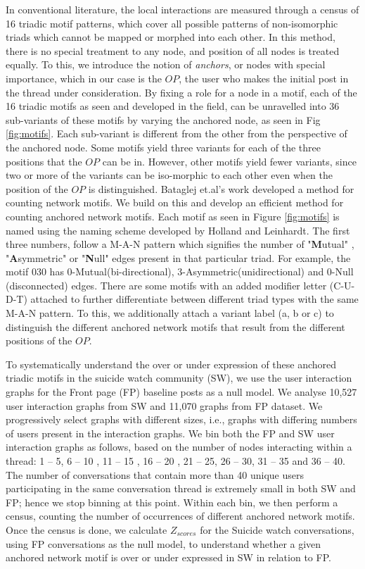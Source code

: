 In conventional literature, the local interactions are measured through a census of 16 triadic motif patterns\cite{faust20077}, which cover all possible patterns of non-isomorphic triads which cannot be mapped or morphed into each other. In this method, there is no special treatment to any node, and position of all nodes is treated equally. To this, we introduce the notion of \textit{anchors}, or nodes with special importance, which in our case is the $OP$, the user who makes the initial post in the thread under consideration. 
By fixing a role for a node in a motif, each of the 16 triadic motifs as seen and developed in the field\cite{faust20077, holland1977method}, can be unravelled into 36 sub-variants of these motifs by varying the anchored node, as seen in Fig \ref{fig:motifs}. Each sub-variant is different from the other from the perspective of the anchored node. Some motifs yield three variants for each of the three positions that the $OP$ can be in. However, other motifs yield fewer variants, since two or more of the variants can be iso-morphic to each other even when the position of the $OP$ is distinguished.  Bataglej et.al's work\cite{Batagelj2001} developed a method for counting network motifs. We build on this and develop an efficient method for counting anchored network motifs. 
Each motif as seen in Figure \ref{fig:motifs} is named using the naming scheme  developed by Holland and Leinhardt\cite{holland1974statistical}. The first three numbers, follow a M-A-N pattern which signifies the number of "\textbf{M}utual" , "\textbf{A}symmetric" or "\textbf{N}ull" edges present in that particular triad. For example, the motif 030 has 0-Mutual(bi-directional), 3-Asymmetric(unidirectional) and 0-Null (disconnected) edges. There are some motifs with an added modifier letter (C-U-D-T) attached to further differentiate between different triad types with the same M-A-N pattern.
To this, we additionally attach a variant label (a, b or c) to distinguish the different anchored network motifs that result from the different positions of the $OP$.


To systematically understand the over or under expression of these anchored triadic motifs in the suicide watch community (SW), we use the user interaction graphs for the Front page (FP) baseline posts as a null model. We analyse 10,527 user interaction graphs from SW and 11,070 graphs from FP dataset.
We progressively select graphs with different sizes, i.e., graphs with differing numbers of users present in the interaction graphs. We bin both the FP and SW user interaction graphs as follows, based on the number of nodes interacting within a thread: 1 -- 5, 6 -- 10 , 11 -- 15 , 16 -- 20 , 21 -- 25, 26 -- 30, 31 -- 35 and 36 -- 40. The number of conversations that contain more than 40 unique users participating in the same conversation thread is extremely small in both SW and FP; hence we stop binning at this point.
Within each bin, we then perform a census, counting the number of occurrences of different anchored network motifs. 
Once the census is done, we calculate $Z_{scores}$ for the Suicide watch conversations, using FP conversations as the null model, to understand whether a given anchored network motif is over or under expressed in SW in relation to FP.


